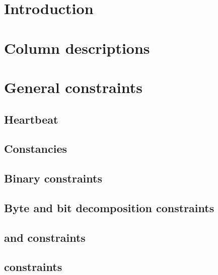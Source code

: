 \def\zero{\graym{0}}
\def\one {\redm{1}}
\def\locRlpNonceSize{\col{rlp\_nonce\_size}}

\section{Introduction}                                          			  \label{rlp_addr: intro}

\section{Column descriptions}                                 			  \label{rlp_addr: columns}

\section{General constraints}
\subsection{Heartbeat}                                      			  \label{rlp_addr: heartbeat}
\subsection{Constancies}                                  			  \label{rlp_addr: constancies}
\subsection{Binary constraints}                                			  \label{rlp_addr: binary}
\subsection{Byte and bit decomposition constraints}           			  \label{rlp_addr: byteDec}
\subsection{\rlpAddrInst{} and  constraints}        			  \label{rlp_addr: recipes}
\subsection{\selectorKeccakRes{} constraints}                  	  \label{rlp_addr: result_selector}

